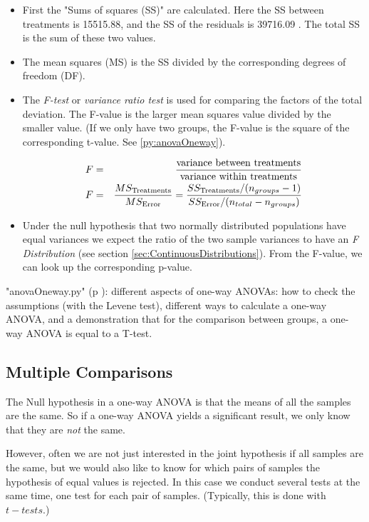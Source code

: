 \begin{itemize}
  \item First the "Sums of squares (SS)" are calculated. Here the SS between treatments is 15515.88, and the SS of the residuals is 39716.09 . The total SS is the sum of these two values.
  \item The mean squares (MS) is the SS divided by the corresponding degrees of freedom (DF).
  \item The \emph{F-test} or \emph{variance ratio test} is used for comparing the factors of the total deviation. The F-value is the larger mean squares value divided by the smaller value. (If we only have two groups, the F-value is the square of the corresponding t-value. See \ref{py:anovaOneway}).

      \begin{eqnarray}
        F &=& \frac{\text{variance between treatments}}{\text{variance within treatments}} \\
        F &=& \frac{MS_\text{Treatments}}{MS_\text{Error}} = {{SS_\text{Treatments} / (n_{groups}-1)} \over {SS_\text{Error} / (n_{total}-n_{groups})}}
      \end{eqnarray}

  \item Under the null hypothesis that two normally distributed populations have equal variances we expect the ratio of the two sample variances to have an \emph{F Distribution} (see section \ref{sec:ContinuousDistributions}). From the F-value, we can look up the corresponding p-value.
\end{itemize}

\PyImg "anovaOneway.py" (p \pageref{py:anovaOneway}): different aspects of one-way ANOVAs: how to check the assumptions (with the Levene test), different ways to calculate a one-way ANOVA, and a demonstration that for the comparison between groups, a one-way ANOVA is equal to a T-test.

\subsection{Multiple Comparisons}

The Null hypothesis in a one-way ANOVA is that the means of all the samples are the same. So if a one-way ANOVA yields a significant result, we only know that they are \emph{not} the same.

However, often we are not just interested in the joint hypothesis if all samples are the same, but we would also like to know for which pairs of samples the hypothesis of equal values is rejected. In this case we conduct several tests at the same time, one test for each pair of samples. (Typically, this is done with $t-tests$.)

